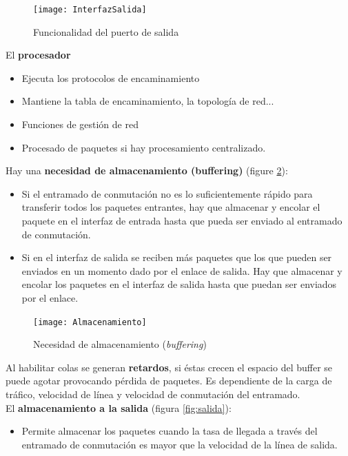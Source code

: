 \documentclass[10pt,portrait, twocolumn]{article}
\begin{document}
\begin{figure}[h]
	\centering
     \texttt{[image: InterfazSalida]}
      \caption{Funcionalidad del puerto de salida}
      \label{fig:input}
\end{figure}

El \textbf{procesador} 

\begin{itemize}
\item Ejecuta los protocolos de encaminamiento
\item Mantiene la tabla de encaminamiento, la topología de red...
\item Funciones de gestión de red
\item Procesado de paquetes si hay procesamiento centralizado.
\end{itemize}



Hay una \textbf{necesidad de almacenamiento (buffering)} (figure \ref{fig:buffering}):

	\begin{itemize}
		\item Si el entramado de conmutación no es lo suficientemente rápido para transferir todos los paquetes entrantes, hay que almacenar y encolar el paquete en el interfaz de entrada hasta que pueda ser enviado al entramado de conmutación.
		\item Si en el interfaz de salida se reciben más paquetes que los que pueden ser enviados en un momento dado por el enlace de salida. Hay que almacenar y encolar los paquetes en el interfaz de salida hasta que puedan ser enviados por el enlace.
	\end{itemize}

\begin{figure}[h]
	\centering
     \texttt{[image: Almacenamiento]}
      \caption{Necesidad de almacenamiento (\textit{buffering})}
      \label{fig:buffering}
\end{figure}

Al habilitar colas se generan \textbf{retardos}, si éstas crecen el espacio del buffer se puede agotar provocando pérdida de paquetes. Es dependiente de la carga de tráfico, velocidad de línea y velocidad de conmutación del entramado.\\

El \textbf{almacenamiento a la salida} (figura \ref{fig:salida}): 

\begin{itemize}
\item Permite almacenar los paquetes cuando la tasa de llegada a través del entramado de conmutación es mayor que la velocidad de la línea de salida.
\end{itemize}
\end{document}
